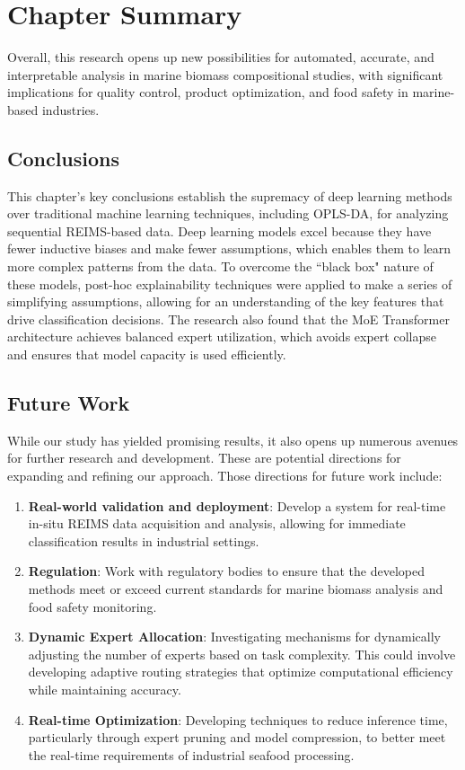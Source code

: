 \section{Chapter Summary}
\label{sec:conclusion-and-future-work}

Overall, this research opens up new possibilities for automated, accurate, and interpretable analysis in marine biomass compositional studies, with significant implications for quality control, product optimization, and food safety in marine-based industries.

\subsection{Conclusions}

This chapter's key conclusions establish the supremacy of deep learning methods over traditional machine learning techniques, including OPLS-DA, for analyzing sequential REIMS-based data. Deep learning models excel because they have fewer inductive biases and make fewer assumptions, which enables them to learn more complex patterns from the data. To overcome the ``black box" nature of these models, post-hoc explainability techniques were applied to make a series of simplifying assumptions, allowing for an understanding of the key features that drive classification decisions. The research also found that the MoE Transformer architecture achieves balanced expert utilization, which avoids expert collapse and ensures that model capacity is used efficiently. 

\subsection{Future Work}

While our study has yielded promising results, it also opens up numerous avenues for further research and development. These are potential directions for expanding and refining our approach. Those directions for future work include: 

\begin{enumerate}
    \item \textbf{Real-world validation and deployment}: Develop a system for real-time in-situ REIMS data acquisition and analysis, allowing for immediate classification results in industrial settings.
    \item \textbf{Regulation}: Work with regulatory bodies to ensure that the developed methods meet or exceed current standards for marine biomass analysis and food safety monitoring.
    \item \textbf{Dynamic Expert Allocation}: Investigating mechanisms for dynamically adjusting the number of experts based on task complexity. This could involve developing adaptive routing strategies that optimize computational efficiency while maintaining accuracy.
    \item \textbf{Real-time Optimization}: Developing techniques to reduce inference time, particularly through expert pruning and model compression, to better meet the real-time requirements of industrial seafood processing.
\end{enumerate} 
